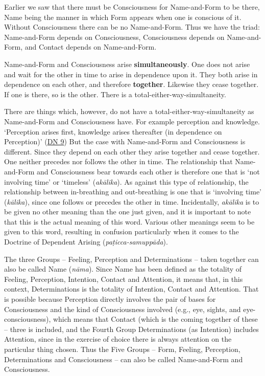Earlier we saw that there must be Consciousness for Name-and-Form to be there, Name being the manner in which Form appears when one is conscious of it. Without Consciousness there can be no Name-and-Form. Thus we have the triad: Name-and-Form depends on Consciousness, Consciousness depends on Name-and-Form, and Contact depends on Name-and-Form.

Name-and-Form and Consciousness arise \textbf{simultaneously}. One does not arise and wait for the other in time to arise in dependence upon it. They both arise in dependence on each other, and therefore \textbf{together}. Likewise they cease together. If one is there, so is the other. There is a total-either-way-simultaneity.

There are things which, however, do not have a total-either-way-simultaneity as Name-and-Form and Consciousness have. For example perception and knowledge. `Perception arises first, knowledge arises thereafter (in dependence on Perception)' (\href{https://suttacentral.net/dn9/en/thanissaro}{DN 9}) But the case with Name-and-Form and Consciousness is different. Since they depend on each other they arise together and cease together. One neither precedes nor follows the other in time. The relationship that Name-and-Form and Consciousness bear towards each other is therefore one that is `not involving time' or `timeless' (\emph{akālika}). As against this type of relationship, the relationship between in-breathing and out-breathing is one that is `involving time' (\emph{kālika}), since one follows or precedes the other in time. Incidentally, \emph{akālika} is to be given no other meaning than the one just given, and it is important to note that this is the actual meaning of this word. Various other meanings seem to be given to this word, resulting in confusion particularly when it comes to the Doctrine of Dependent Arising (\emph{paṭicca-samuppāda}).

The three Groups -- Feeling, Perception and Determinations -- taken together can also be called Name (\emph{nāma}). Since Name has been defined as the totality of Feeling, Perception, Intention, Contact and Attention, it means that, in this context, Determinations is the totality of Intention, Contact and Attention. That is possible because Perception directly involves the pair of bases for Consciousness and the kind of Consciousness involved (e.g., eye, sights, and eye-consciousness), which means that Contact (which is the coming together of these -- three is included, and the Fourth Group Determinations (as Intention) includes Attention, since in the exercise of choice there is always attention on the particular thing chosen. Thus the Five Groups -- Form, Feeling, Perception, Determinations and Consciousness -- can also be called Name-and-Form and Consciousness.
